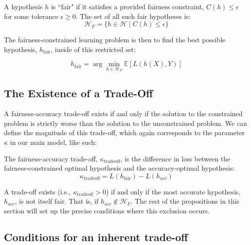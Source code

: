 \begin{definition}
A hypothesis $h$ is ``fair" if it satisfies a provided fairness constraint, $C(h) \leq \epsilon$ for some tolerance $\epsilon \geq 0$. The set of all such fair hypotheses is:
\begin{equation}
\mathcal{H}_F = \{h \in \mathcal{H} \mid C(h) \leq \epsilon \}
\end{equation}
\end{definition}

The fairness-constrained learning problem is then to find the best possible hypothesis, $h_{\text{fair}}$, inside of this restricted set:

\begin{equation}
h_{\text{fair}} = \arg\min_{h \in \mathcal{H}_F} \mathbb{E}[L(h(X), Y)]
\end{equation}

\subsection{The Existence of a Trade-Off}

A fairness-accuracy trade-off exists if and only if the solution to the constrained problem is strictly worse than the solution to the unconstrained problem. We can define the magnitude of this trade-off, which again corresponds to the parameter $\kappa$ in our main model, like such:

\begin{definition}
The fairness-accuracy trade-off, $\kappa_{\text{tradeoff}}$, is the difference in loss between the fairness-constrained optimal hypothesis and the accuracy-optimal hypothesis:
\begin{equation}
\kappa_{\text{tradeoff}} = L(h_{\text{fair}}) - L(h_{acc})
\end{equation}
\end{definition}

A trade-off exists (i.e., $\kappa_{\text{tradeoff}} > 0$) if and only if the most accurate hypothesis, $h_{acc}$, is not itself fair. That is, if $h_{acc} \notin \mathcal{H}_F$. The rest of the propositions in this section will set up the precise conditions where this exclusion occurs.

\subsection{Conditions for an inherent trade-off}

